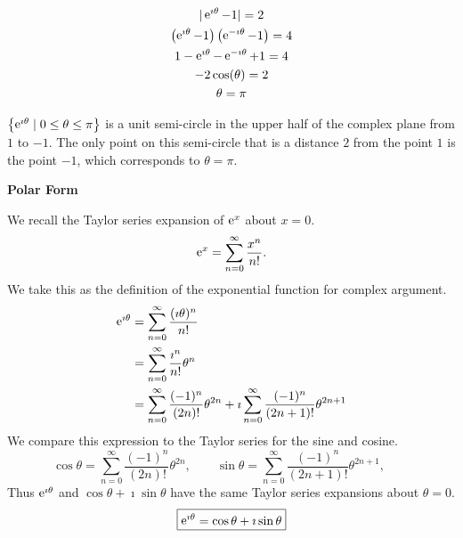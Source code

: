 {%
\begin{Solution}
  \label{solution e i theta - 1 = 2}
  \begin{gather*}
    |\mathop{\mathrm{e}}\nolimits^{\imath \theta} - 1| = 2 
    \\
    \left( \mathop{\mathrm{e}}\nolimits^{\imath \theta} - 1 \right) \left( \mathop{\mathrm{e}}\nolimits^{-\imath \theta} - 1 \right) = 4 
    \\
    1 - \mathop{\mathrm{e}}\nolimits^{\imath \theta} - \mathop{\mathrm{e}}\nolimits^{-\imath \theta} + 1 = 4 
    \\
    -2 \cos(\theta) = 2 
    \\
    \theta = \pi
  \end{gather*}

  $\left\{ \mathop{\mathrm{e}}\nolimits^{\imath \theta} \mid 0 \leq \theta \leq \pi \right\}$ is a unit semi-circle in the
  upper half of the complex plane from $1$ to $-1$.  The only point on this
  semi-circle that is a distance $2$ from the point $1$ is the point $-1$,
  which corresponds to $\theta = \pi$.
\end{Solution}









\begin{large}
  \noindent
  \textbf{Polar Form}
\end{large}




\begin{Solution}
  \label{solution eulers formula}
  We recall the Taylor series expansion of $\mathop{\mathrm{e}}\nolimits^x$ about $x = 0$.
  \[
  \mathop{\mathrm{e}}\nolimits^x = \sum_{n = 0}^\infty \frac{x^n}{n!}.
  \]
  We take this as the definition of the exponential function for complex
  argument.
  \begin{align*}
    \mathop{\mathrm{e}}\nolimits^{\imath \theta} 
    &= \sum_{n = 0}^\infty \frac{(\imath \theta)^n}{n!} 
    \\
    &= \sum_{n = 0}^\infty \frac{\imath^n}{n!} \theta^n
    \\
    &= \sum_{n = 0}^\infty \frac{(-1)^n}{(2 n)!} \theta^{2n}
    + \imath \sum_{n = 0}^\infty \frac{(-1)^n}{(2 n + 1)!} \theta^{2n+1}
  \end{align*}
  We compare this expression to the Taylor series for the sine and cosine.
  \[
  \cos \theta = \sum_{n = 0}^\infty \frac{(-1)^n}{(2 n)!} \theta^{2n}, \qquad
  \sin \theta = \sum_{n = 0}^\infty \frac{(-1)^n}{(2 n + 1)!} \theta^{2n+1}, \qquad
  \]
  Thus $\mathop{\mathrm{e}}\nolimits^{\imath \theta}$ and $\cos \theta + \imath \sin \theta$ have the same Taylor
  series expansions about $\theta = 0$. 
  \[
  \boxed{
    \mathop{\mathrm{e}}\nolimits^{\imath \theta} = \cos \theta + \imath \sin \theta
    }
  \]
\end{Solution}








}
